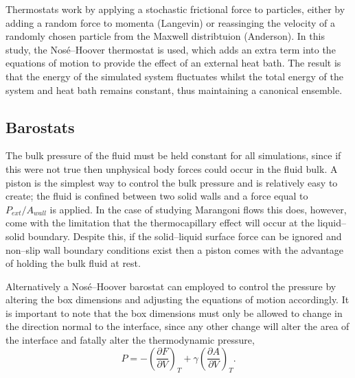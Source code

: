 Thermostats work by applying a stochastic frictional force to particles, either by adding a random force to momenta (Langevin)\cite{Langevin} or reassinging the velocity of a randomly chosen particle from the Maxwell distribtuion (Anderson)\cite{AndersonTherm}.
In this study, the Nos\'{e}--Hoover thermostat is used, which adds an extra term into the equations of motion to provide the effect of an external heat bath.\cite{NoseHoover1, NoseHoover2, NoseHoover3}
The result is that the energy of the simulated system fluctuates whilst the total energy of the system and heat bath remains constant, thus maintaining a canonical ensemble.

\subsection{Barostats}
The bulk pressure of the fluid must be held constant for all simulations, since if this were not true then unphysical body forces could occur in the fluid bulk.
A piston is the simplest way to control the bulk pressure and is relatively easy to create; the fluid is confined between two solid walls and a force equal to $P_{ext} / A_{wall}$ is applied.
In the case of studying Marangoni flows this does, however, come with the limitation that the thermocapillary effect will occur at the liquid--solid boundary.
Despite this, if the solid--liquid surface force can be ignored and non--slip wall boundary conditions exist then a piston comes with the advantage of holding the bulk fluid at rest.

Alternatively a Nos\'{e}--Hoover barostat can employed to control the pressure by altering the box dimensions and adjusting the equations of motion accordingly. \cite{NoseHoover1, NoseHoover2, NoseHoover3}
It is important to note that the box dimensions must only be allowed to change in the direction normal to the interface, since any other change will alter the area of the interface and fatally alter the thermodynamic pressure,
\begin{equation}
P = - \left( \frac{\partial F}{\partial V} \right)_{T} + \gamma \left( \frac{\partial A}{\partial V} \right)_{T}.
\end{equation}

